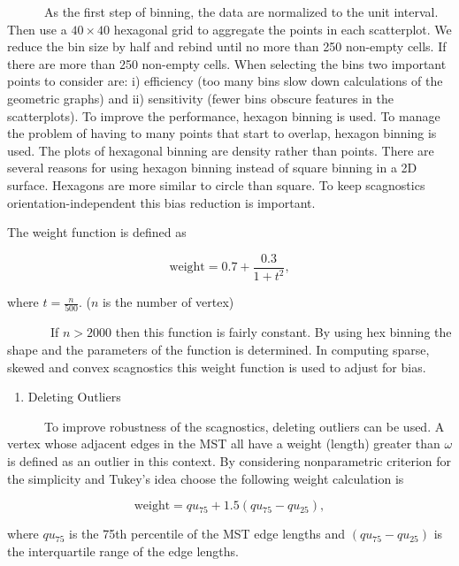 \documentclass{article}
\begin{document}
~~~~~~As the first step of binning, the data are normalized to the unit
interval. Then use a \(40 \times 40\) hexagonal grid to aggregate the
points in each scatterplot. We reduce the bin size by half and rebind
until no more than 250 non-empty cells. If there are more than 250
non-empty cells. When selecting the bins two important points to
consider are: i) efficiency (too many bins slow down calculations of the
geometric graphs) and ii) sensitivity (fewer bins obscure features in
the scatterplots). To improve the performance, hexagon binning is used.
To manage the problem of having to many points that start to overlap,
hexagon binning is used. The plots of hexagonal binning are density
rather than points. There are several reasons for using hexagon binning
instead of square binning in a 2D surface. Hexagons are more similar to
circle than square. To keep scagnostics orientation-independent this
bias reduction is important.

The weight function is defined as

\begin{equation}
    \text{weight} = 0.7 + \frac{0.3}{1 + t^2},
    \label{w2}
\end{equation}

where \(t=\frac{n}{500}\). (\(n\) is the number of vertex)

~~~~~~~If \(n > 2000\) then this function is fairly constant. By using
hex binning the shape and the parameters of the function is determined.
In computing sparse, skewed and convex scagnostics this weight function
is used to adjust for bias.

\begin{enumerate}
\def\labelenumi{\roman{enumi})}
\setcounter{enumi}{1}
\tightlist
\item
  Deleting Outliers
\end{enumerate}

~~~~~~To improve robustness of the scagnostics, deleting outliers can be
used. A vertex whose adjacent edges in the MST all have a weight
(length) greater than \(\omega\) is defined as an outlier in this
context. By considering nonparametric criterion for the simplicity and
Tukey's idea choose the following weight calculation is

\begin{equation}
    \text{weight} = qu_{75} + 1.5(qu_{75} - qu_{25}),
    \label{w1}
\end{equation}

where \(qu_{75}\) is the 75th percentile of the MST edge lengths and
\((qu_{75} - qu_{25})\) is the interquartile range of the edge lengths.
\end{document}
